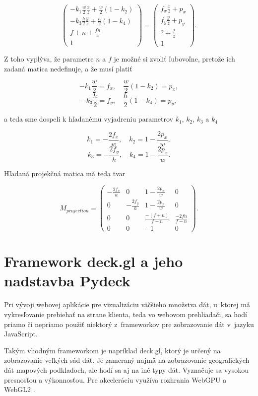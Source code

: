$$
\begin{pmatrix}
- k_1 \frac{w}{2} \frac{x}{z} + \frac{w}{2} (1 - k_2)\\
- k_3 \frac{h}{2} \frac{y}{z} + \frac{h}{2} (1 - k_4)\\
f + n + \frac{fn}{z} \\
1
\end{pmatrix}
=
\begin{pmatrix}
f_x \frac{x}{z} + p_x \\
f_y \frac{y}{z} + p_y \\
? + \frac{?}{z} \\
1
\end{pmatrix} \mathrm{.}
$$

Z toho vyplýva, že parametre $n$ a $f$ je možné si zvoliť ľubovoľne, pretože ich zadaná matica nedefinuje, a že musí platiť

$$
-k_1 \frac{w}{2} = f_x 
\mathrm{,} \quad
\frac{w}{2} (1 - k_2) = p_x \mathrm{,}
$$
$$
-k_3 \frac{h}{2} = f_y
\mathrm{,} \quad
\frac{h}{2} (1 - k_4) = p_y \mathrm{,}
$$

a teda sme dospeli k hľadanému vyjadreniu parametrov $k_1$, $k_2$, $k_3$ a $k_4$

$$
k_1 = - \frac{2 f_x}{w}
\mathrm{,} \quad
k_2 = 1 - \frac{2 p_x}{w} \mathrm{,}
$$
$$
k_3 = - \frac{2 f_y}{h}
\mathrm{,} \quad
k_4 = 1 - \frac{2 p_x}{w} \mathrm{.}
$$

Hľadaná projekčná matica má teda tvar

$$
M_{projection}
=
\begin{pmatrix}
- \frac{2 f_x}{w} & 0 & 1 - \frac{2 p_x}{w} & 0 \\
0 & - \frac{2 f_y}{h} & 1 - \frac{2 p_x}{w} & 0 \\
0 & 0 & \frac{-(f+n)}{f-n} & \frac{-2fn}{f-n} \\
0 & 0 & -1 & 0
\end{pmatrix} \mathrm{.}
$$

\section{Framework deck.gl a jeho nadstavba Pydeck}
\label{sec:deck_gl}

Pri vývoji webovej aplikácie pre vizualizáciu väčšieho množstva dát, u~ktorej má vykresľovanie prebiehať na strane klienta, teda vo webovom prehliadači, sa hodí priamo či nepriamo použiť niektorý z~frameworkov pre zobrazovanie dát v~jazyku JavaScript.

Takým vhodným frameworkom je napríklad deck.gl, ktorý je určený na zobrazovanie veľkých sád dát. Je zameraný najmä na zobrazovanie geografických dát mapových podkladoch, ale hodí sa aj na iné typy dát. Vyznačuje sa vysokou presnosťou a výkonnosťou. Pre akceleráciu využíva rozhrania WebGPU a WebGL2 \cite{deck.gl_documentation}.


